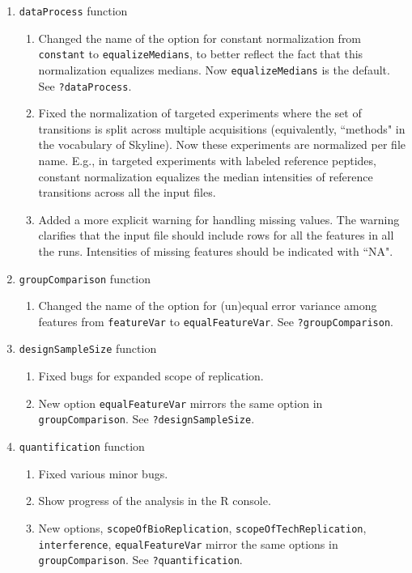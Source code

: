 \documentclass[10pt]{article}
\begin{document}
\begin{enumerate}

\item {\tt dataProcess} function 
	\begin{enumerate}
	\item Changed the name of the option for constant normalization from {\tt constant} to {\tt equalizeMedians}, to better reflect the fact that this normalization equalizes medians. Now {\tt equalizeMedians} is the default. See {\tt ?dataProcess}.
	\item Fixed the normalization of targeted experiments where the set of transitions is split across multiple acquisitions (equivalently, ``methods" in the vocabulary of Skyline). Now these experiments are normalized per file name. E.g., in targeted experiments with labeled reference peptides, constant normalization equalizes the median intensities of reference transitions across all the input files.
	\item Added a more explicit warning for handling missing values. The warning clarifies that the input file should include rows for all the features in all the runs. Intensities of missing features should be indicated with ``NA".
	\end{enumerate}
	
\item {\tt groupComparison} function 
	\begin{enumerate}
	\item Changed the name of the option for (un)equal error variance among features from {\tt featureVar} to {\tt equalFeatureVar}. See {\tt ?groupComparison}.
	\end{enumerate}
	
\item {\tt designSampleSize} function 
	\begin{enumerate}
	\item Fixed bugs for expanded scope of replication.
	\item New option {\tt equalFeatureVar} mirrors the same option in {\tt groupComparison}. See {\tt ?designSampleSize}.
	\end{enumerate}
	
\item {\tt quantification} function 
	\begin{enumerate}
	\item Fixed various minor bugs.
	\item Show progress of the analysis in the R console.
	\item New options, {\tt scopeOfBioReplication}, {\tt scopeOfTechReplication}, {\tt interference}, {\tt equalFeatureVar} mirror the same options in {\tt groupComparison}. See {\tt ?quantification}.
	\end{enumerate}
	

\end{enumerate}
\end{document}
